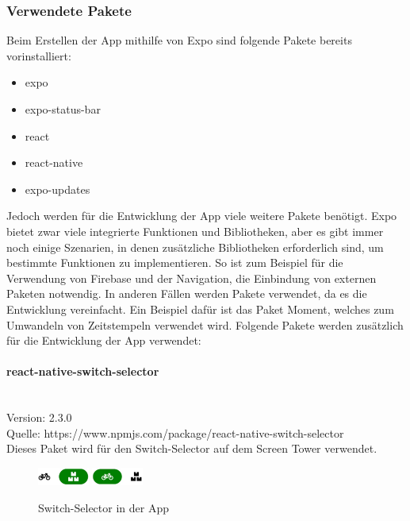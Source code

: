 \subsubsection{Verwendete Pakete}


\bigskip


\noindent Beim Erstellen der App mithilfe von Expo sind folgende Pakete bereits vorinstalliert:
\begin{itemize}
  \item expo
  \item expo-status-bar
  \item react
  \item react-native
  \item expo-updates
\end{itemize}

\noindent Jedoch werden für die Entwicklung der App viele weitere Pakete benötigt. Expo bietet zwar viele integrierte Funktionen und Bibliotheken, aber es gibt immer noch einige Szenarien, in denen zusätzliche Bibliotheken erforderlich sind, um bestimmte Funktionen zu implementieren.
\noindent So ist zum Beispiel für die Verwendung von Firebase und der Navigation, die Einbindung von externen Paketen notwendig.
\noindent In anderen Fällen werden Pakete verwendet, da es die Entwicklung vereinfacht. Ein Beispiel dafür ist das Paket Moment, welches zum Umwandeln von Zeitstempeln verwendet wird.
\noindent Folgende Pakete werden zusätzlich für die Entwicklung der App verwendet:


\paragraph{react-native-switch-selector}\mbox{}\\
Version: 2.3.0\\
Quelle: https://www.npmjs.com/package/react-native-switch-selector\\
Dieses Paket wird für den \Gls{Switch-Selector} auf dem Screen Tower verwendet.
\begin{figure}[H]
  \centering
  \includegraphics[width=0.15\textwidth]{images/app-screenshots/switchselector.png}
  \includegraphics[width=0.15\textwidth]{images/app-screenshots/switchselector2.png}
  \caption{Switch-Selector in der App}
  \label{fig:switchselector}
\end{figure}

